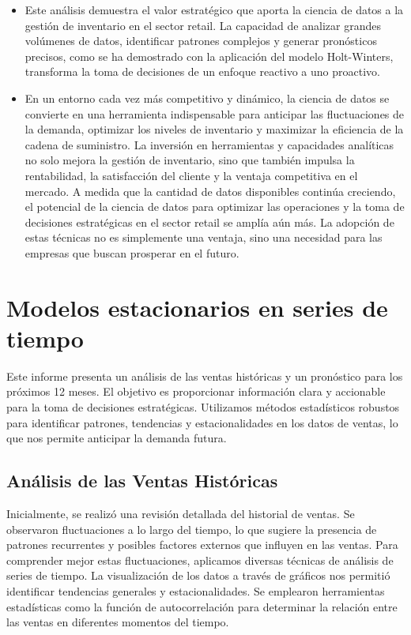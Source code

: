 \documentclass[
]{book}
\begin{document}
\begin{itemize}
\item
  Este análisis demuestra el valor estratégico que aporta la ciencia de datos a la gestión de inventario en el sector retail. La capacidad de analizar grandes volúmenes de datos, identificar patrones complejos y generar pronósticos precisos, como se ha demostrado con la aplicación del modelo Holt-Winters, transforma la toma de decisiones de un enfoque reactivo a uno proactivo.
\item
  En un entorno cada vez más competitivo y dinámico, la ciencia de datos se convierte en una herramienta indispensable para anticipar las fluctuaciones de la demanda, optimizar los niveles de inventario y maximizar la eficiencia de la cadena de suministro. La inversión en herramientas y capacidades analíticas no solo mejora la gestión de inventario, sino que también impulsa la rentabilidad, la satisfacción del cliente y la ventaja competitiva en el mercado. A medida que la cantidad de datos disponibles continúa creciendo, el potencial de la ciencia de datos para optimizar las operaciones y la toma de decisiones estratégicas en el sector retail se amplía aún más. La adopción de estas técnicas no es simplemente una ventaja, sino una necesidad para las empresas que buscan prosperar en el futuro.
\end{itemize}

\chapter{\texorpdfstring{\textbf{Modelos estacionarios en series de tiempo}}{Modelos estacionarios en series de tiempo}}\label{modelos-estacionarios-en-series-de-tiempo}

Este informe presenta un análisis de las ventas históricas y un pronóstico para los próximos 12 meses. El objetivo es proporcionar información clara y accionable para la toma de decisiones estratégicas. Utilizamos métodos estadísticos robustos para identificar patrones, tendencias y estacionalidades en los datos de ventas, lo que nos permite anticipar la demanda futura.

\section{\texorpdfstring{\textbf{Análisis de las Ventas Históricas}}{Análisis de las Ventas Históricas}}\label{anuxe1lisis-de-las-ventas-histuxf3ricas}

Inicialmente, se realizó una revisión detallada del historial de ventas. Se observaron fluctuaciones a lo largo del tiempo, lo que sugiere la presencia de patrones recurrentes y posibles factores externos que influyen en las ventas. Para comprender mejor estas fluctuaciones, aplicamos diversas técnicas de análisis de series de tiempo. La visualización de los datos a través de gráficos nos permitió identificar tendencias generales y estacionalidades. Se emplearon herramientas estadísticas como la función de autocorrelación para determinar la relación entre las ventas en diferentes momentos del tiempo.
\end{document}
